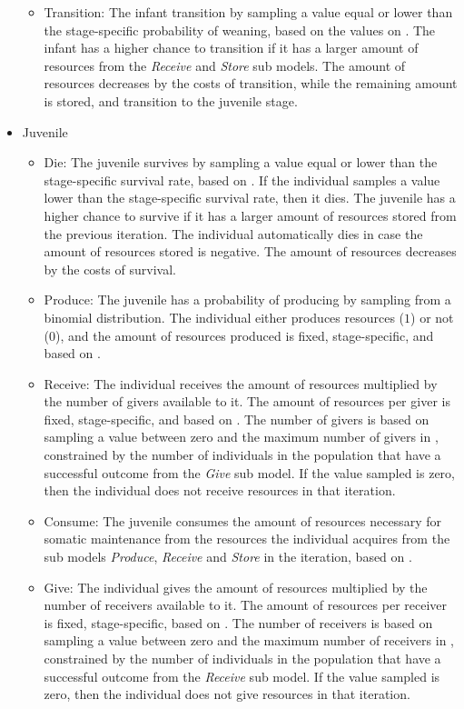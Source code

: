 \documentclass{article}
\begin{document}
\begin{itemize}
\begin{itemize}
        \item Transition: The infant transition by sampling a value equal or lower than the stage-specific probability of weaning, based on the values on \cite{wood2017dynamics}. The infant has a higher chance to transition if it has a larger amount of resources from the \emph{Receive} and \emph{Store} sub models. The amount of resources decreases by the costs of transition, while the remaining amount is stored, and transition to the juvenile stage.
    \end{itemize}
    \item Juvenile
    \begin{itemize}
        \item Die: The juvenile survives by sampling a value equal or lower than the stage-specific survival rate, based on \cite{gurven2007longevity}. If the individual samples a value lower than the stage-specific survival rate, then it dies. The juvenile has a higher chance to survive if it has a larger amount of resources stored from the previous iteration. The individual automatically dies in case the amount of resources stored is negative. The amount of resources decreases by the costs of survival.
        \item Produce: The juvenile has a probability of producing by sampling from a binomial distribution. The individual either produces resources ($1$) or not ($0$), and the amount of resources produced is fixed, stage-specific, and based on \cite{koster2020life}.
        \item Receive: The individual receives the amount of resources multiplied by the number of givers available to it. The amount of resources per giver is fixed, stage-specific, and based on \cite{gurven2004give}. The number of givers is based on sampling a value between zero and the maximum number of givers in \cite{gurven2004give}, constrained by the number of individuals in the population that have a successful outcome from the \emph{Give} sub model. If the value sampled is zero, then the individual does not receive resources in that iteration.
        \item Consume: The juvenile consumes the amount of resources necessary for somatic maintenance from the resources the individual acquires from the sub models \emph{Produce}, \emph{Receive} and \emph{Store} in the iteration, based on \cite{kaplan2000theory, pontzer2021daily}.
        \item Give: The individual gives the amount of resources multiplied by the number of receivers available to it. The amount of resources per receiver is fixed, stage-specific, based on \cite{gurven2004give}. The number of receivers is based on sampling a value between zero and the maximum number of receivers in \cite{gurven2004give}, constrained by the number of individuals in the population that have a successful outcome from the \emph{Receive} sub model. If the value sampled is zero, then the individual does not give resources in that iteration.

\end{itemize}
\end{itemize}
\end{document}

